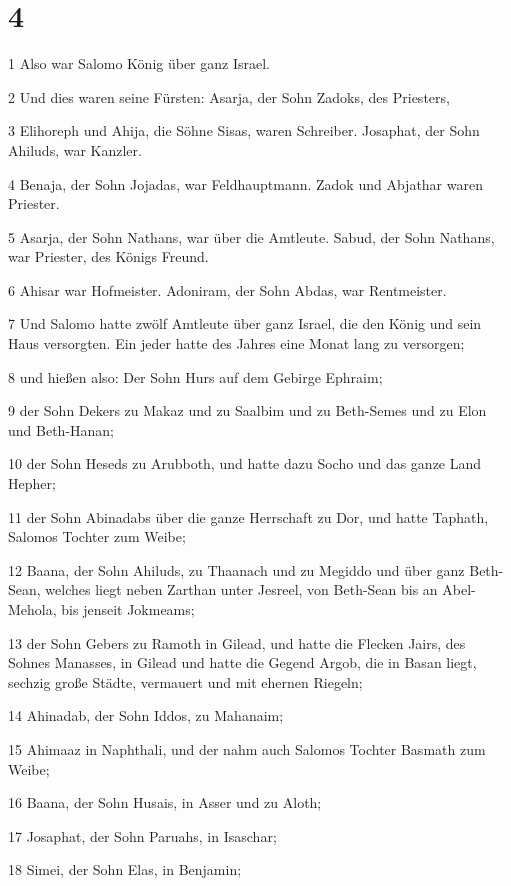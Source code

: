 \chapter{4}

\par 1 Also war Salomo König über ganz Israel.
\par 2 Und dies waren seine Fürsten: Asarja, der Sohn Zadoks, des Priesters,
\par 3 Elihoreph und Ahija, die Söhne Sisas, waren Schreiber. Josaphat, der Sohn Ahiluds, war Kanzler.
\par 4 Benaja, der Sohn Jojadas, war Feldhauptmann. Zadok und Abjathar waren Priester.
\par 5 Asarja, der Sohn Nathans, war über die Amtleute. Sabud, der Sohn Nathans, war Priester, des Königs Freund.
\par 6 Ahisar war Hofmeister. Adoniram, der Sohn Abdas, war Rentmeister.
\par 7 Und Salomo hatte zwölf Amtleute über ganz Israel, die den König und sein Haus versorgten. Ein jeder hatte des Jahres eine Monat lang zu versorgen;
\par 8 und hießen also: Der Sohn Hurs auf dem Gebirge Ephraim;
\par 9 der Sohn Dekers zu Makaz und zu Saalbim und zu Beth-Semes und zu Elon und Beth-Hanan;
\par 10 der Sohn Heseds zu Arubboth, und hatte dazu Socho und das ganze Land Hepher;
\par 11 der Sohn Abinadabs über die ganze Herrschaft zu Dor, und hatte Taphath, Salomos Tochter zum Weibe;
\par 12 Baana, der Sohn Ahiluds, zu Thaanach und zu Megiddo und über ganz Beth-Sean, welches liegt neben Zarthan unter Jesreel, von Beth-Sean bis an Abel-Mehola, bis jenseit Jokmeams;
\par 13 der Sohn Gebers zu Ramoth in Gilead, und hatte die Flecken Jairs, des Sohnes Manasses, in Gilead und hatte die Gegend Argob, die in Basan liegt, sechzig große Städte, vermauert und mit ehernen Riegeln;
\par 14 Ahinadab, der Sohn Iddos, zu Mahanaim;
\par 15 Ahimaaz in Naphthali, und der nahm auch Salomos Tochter Basmath zum Weibe;
\par 16 Baana, der Sohn Husais, in Asser und zu Aloth;
\par 17 Josaphat, der Sohn Paruahs, in Isaschar;
\par 18 Simei, der Sohn Elas, in Benjamin;
